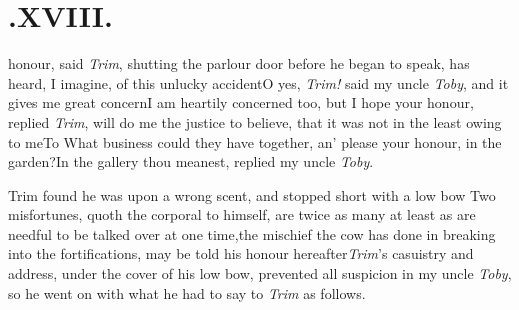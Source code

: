 \documentclass{article}
\begin{document}
\medskip
\section{.\enspace XVIII.}

 honour, said \textit{Trim}, shutting\break
the parlour door before he began\break
to speak, has heard, I imagine, of this
unlucky accident\tsh O yes,
\textit{Trim!} said my uncle \textit{Toby}, and it gives me
great\break
concern\tsk I am heartily concerned too, but I hope your honour,
replied \textit{Trim},\break
will do me the justice to believe, that it was
not in the least owing to me\tsh To
What business could they have together, an’ please your honour, in
the garden?\tsk\break In the gallery thou meanest, replied my
uncle \textit{Toby}.

Trim found he was upon a wrong\break
scent, and stopped short with a low bow\break
\tsh Two misfortunes, quoth the corporal to
himself, are twice as many at least as are needful to be talked
over at one time,\break\tsh the mischief the cow has done in
breaking into the fortifications, may be 
told his honour hereafter\tsk \textit{Trim}’s casuistry and address,
under the cover of his low bow, prevented all suspicion in my uncle
\textit{Toby}, so he went on with what he had to say to \textit{Trim}
as follows.
\end{document}

